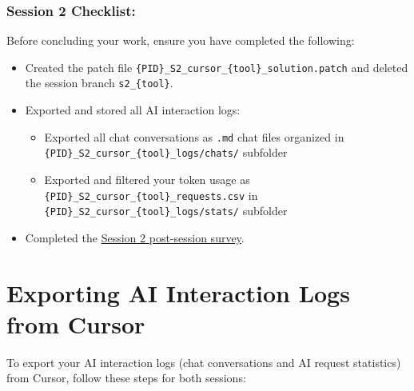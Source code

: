 \documentclass[11pt, a4paper]{article}
\begin{document}
\subsubsection*{Session 2 Checklist:}
\label{sec:session-2-checklist}
Before concluding your work, ensure you have completed the following:
\begin{itemize}
    \item Created the patch file \verb|{PID}_S2_cursor_{tool}_solution.patch| and deleted the session branch \verb|s2_{tool}|.
    \item Exported and stored all AI interaction logs:
    \begin{itemize}
        \item Exported all chat conversations as \verb|.md| chat files organized in \verb|{PID}_S2_cursor_{tool}_logs/chats/| subfolder
        \item Exported and filtered your token usage as \verb|{PID}_S2_cursor_{tool}_requests.csv| in \verb|{PID}_S2_cursor_{tool}_logs/stats/| subfolder
    \end{itemize}
    \item Completed the \href{https://forms.gle/dPJY5vYg6XwU4T5b8}{Session 2 post-session survey}.
\end{itemize}

\newpage

\section{Exporting AI Interaction Logs from Cursor}
\label{sec:exporting-logs}

To export your AI interaction logs (chat conversations and AI request statistics) from Cursor, follow these steps for both sessions:
\end{document}
